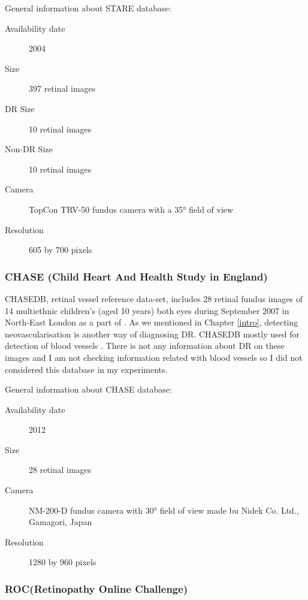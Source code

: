 General information about STARE database:

\begin{description}
    \item[Availability date] 2004
    \item[Size] 397 retinal images
    \item[DR Size] 10 retinal images
    \item[Non-DR Size] 10 retinal images
    \item[Camera] TopCon TRV-50 fundus camera with a 35° field of view
    \item[Resolution] 605 by 700 pixels
\end{description}

\subsubsection{CHASE (Child Heart And Health Study in England)}

CHASEDB, retinal vessel reference data-set, includes 28 retinal fundus images of 14 multiethnic children's (aged 10 years) both eyes during September 2007 in North-East London as a part of \citep{fraz2012ensemble}. As we mentioned in Chapter \ref{intro}, detecting neovascularisation is another way of diagnosing DR. CHASEDB mostly used for detection of blood vessels \citep{liskowski2016segmenting} \citep{elbalaoui2016automatic}. There is not any information about DR on these images and I am not checking information related with blood vessels so I did not considered this database in my experiments.

General information about CHASE database:
\begin{description}
    \item[Availability date] 2012
    \item[Size] 28 retinal images
    \item[Camera] NM-200-D fundus camera with 30° field of view made bu Nidek Co. Ltd., Gamagori, Japan
    \item[Resolution] 1280 by 960 pixels
\end{description}

\subsubsection{ROC(Retinopathy Online Challenge)}

